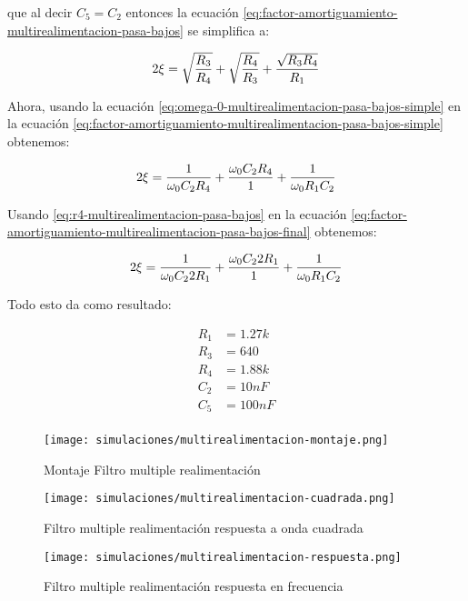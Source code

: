 que al decir $C_5 = C_2$ entonces la ecuación \ref{eq:factor-amortiguamiento-multirealimentacion-pasa-bajos} se simplifica a:

\begin{equation}
    2\xi = \sqrt{\frac{R_3}{R_4}} + \sqrt{\frac{R_4}{R_3}} + \frac{\sqrt{R_3 R_4}}{R_1} 
    \label{eq:factor-amortiguamiento-multirealimentacion-pasa-bajos-simple}
\end{equation}

Ahora, usando la ecuación \ref{eq:omega-0-multirealimentacion-pasa-bajos-simple} en la ecuación \ref{eq:factor-amortiguamiento-multirealimentacion-pasa-bajos-simple} obtenemos:

\begin{equation}
    2\xi = \frac{1}{\omega_0 C_2 R_4} + \frac{\omega_0 C_2 R_4}{1} + \frac{1}{\omega_0 R_1 C_2} 
    \label{eq:factor-amortiguamiento-multirealimentacion-pasa-bajos-final}
\end{equation}

Usando \ref{eq:r4-multirealimentacion-pasa-bajos} en la ecuación \ref{eq:factor-amortiguamiento-multirealimentacion-pasa-bajos-final} obtenemos:

\begin{equation}
    2\xi = \frac{1}{\omega_0 C_2 2R_1} + \frac{\omega_0 C_2 2R_1}{1} + \frac{1}{\omega_0 R_1 C_2} 
    \label{eq:factor-amortiguamiento-multirealimentacion-pasa-bajos-final-final}
\end{equation}

Todo esto da como resultado:

\begin{align*}
    R_1 &= 1.27k \\
    R_3 &= 640 \\
    R_4 &= 1.88k \\
    C_2 &= 10nF \\
    C_5 &= 100nF \\
\end{align*}

\begin{figure}[ht]
    \centering
    \texttt{[image: simulaciones/multirealimentacion-montaje.png]}
    \caption{Montaje Filtro multiple realimentación}\label{fig:sim-multirealimentacion-montaje} 
\end{figure}
\begin{figure}[ht]
    \centering
    \texttt{[image: simulaciones/multirealimentacion-cuadrada.png]}
    \caption{Filtro multiple realimentación respuesta a onda cuadrada}
    \label{fig:sim-multirealimentacion-cuadrada} 
\end{figure}
\begin{figure}[ht]
    \centering
    \texttt{[image: simulaciones/multirealimentacion-respuesta.png]}
    \caption{Filtro multiple realimentación respuesta en frecuencia  }
    \label{fig:sim-multirealimentacion-respuesta} 
\end{figure}